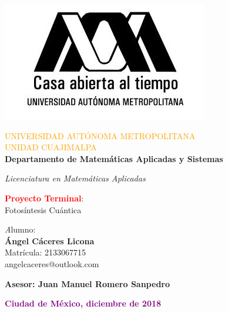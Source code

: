 \documentclass[letterpaper,12pt,oneside]{book}
\begin{document}

\pagestyle{plain}

\begin{center}
\includegraphics[scale=0.7]{uamL}
\end{center}
\begin{center}
\textcolor{orange} { \Large UNIVERSIDAD AUT\'ONOMA METROPOLITANA\\ 
UNIDAD CUAJIMALPA}\\
{\bf Departamento de Matem\'aticas Aplicadas y Sistemas}
\end{center}
\vskip 1cm


\begin{center}
{ \large \it Licenciatura en Matem\'aticas Aplicadas}
\end{center}




\vskip 1.5cm

\begin{center}
 \textcolor{red} {\bf Proyecto Terminal}: \\
 Fotos\'intesis Cu\'antica
\end{center}
\vskip 1.5cm

\begin{center}
{{ \emph Alumno}:\\
{\bf\'Angel C\'aceres Licona}\\
Matrícula: 2133067715\\ 
angelcaceres@outlook.com\\ }
\end{center}



\vskip 1cm

\begin{center}
{\bf Asesor: Juan Manuel Romero Sanpedro}
\end{center}


\vskip 1cm

\begin{center}
 \textcolor{purple} {\bf Ciudad de M\'exico, diciembre de 2018}
\end{center}
\end{document}
